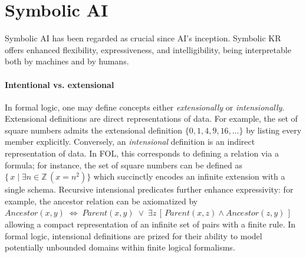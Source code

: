 \section[Symbolic AI]{Symbolic \Gls{AI}}\label{subsec:symbolic-ai}
%
Symbolic \gls{AI} has been regarded as crucial since \gls{AI}'s inception.
%
Symbolic \gls{KR} offers enhanced flexibility, expressiveness, and intelligibility, being interpretable both by machines and by humans.

\paragraph{Intentional vs. extensional}
%
In formal logic, one may define concepts either \emph{extensionally} or \emph{intensionally}.
%
Extensional definitions are direct representations of data.
%
For example, the set of square numbers admits the extensional definition $\{0,1,4,9,16,\dots\}$ by listing every member explicitly.
%
Conversely, an \emph{intensional} definition is an indirect representation of data.
%
In \gls{FOL}, this corresponds to defining a relation via a formula; for instance, the set of square numbers can be defined as $\{\,x\mid \exists n\in\mathbb{Z}\,(x = n^2)\}$ which succinctly encodes an infinite extension with a single schema.
%
Recursive intensional predicates further enhance expressivity: for example, the ancestor relation can be axiomatized by $\mathit{Ancestor}(x,y)\;\Leftrightarrow\;\mathit{Parent}(x,y)\;\lor\;\exists z\,[\,\mathit{Parent}(x,z)\wedge\mathit{Ancestor}(z,y)\,]$ allowing a compact representation of an infinite set of pairs with a finite rule.
%
In formal logic, intensional definitions are prized for their ability to model potentially unbounded domains within finite logical formalisms.


